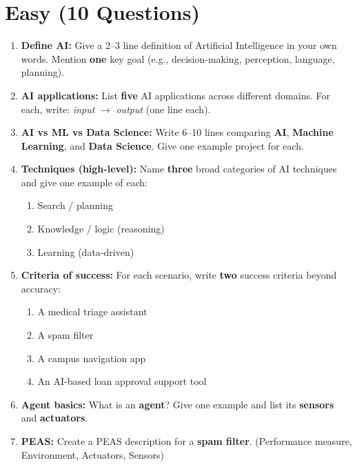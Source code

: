 \documentclass[11pt,a4paper]{article}
\begin{document}
\section*{Easy (10 Questions)}
\begin{enumerate}[label=E\arabic*., leftmargin=*]
  \item \textbf{Define AI:} Give a 2--3 line definition of Artificial Intelligence in your own words.
    Mention \textbf{one} key goal (e.g., decision-making, perception, language, planning).

  \item \textbf{AI applications:} List \textbf{five} AI applications across different domains.
    For each, write: \emph{input} $\rightarrow$ \emph{output} (one line each).

  \item \textbf{AI vs ML vs Data Science:} Write 6--10 lines comparing \textbf{AI}, \textbf{Machine Learning}, and \textbf{Data Science}.
    Give one example project for each.

  \item \textbf{Techniques (high-level):} Name \textbf{three} broad categories of AI techniques and give one example of each:
    \begin{enumerate}[label=(\alph*), leftmargin=*]
      \item Search / planning
      \item Knowledge / logic (reasoning)
      \item Learning (data-driven)
    \end{enumerate}

  \item \textbf{Criteria of success:} For each scenario, write \textbf{two} success criteria beyond accuracy:
    \begin{enumerate}[label=(\alph*), leftmargin=*]
      \item A medical triage assistant
      \item A spam filter
      \item A campus navigation app
      \item An AI-based loan approval support tool
    \end{enumerate}

  \item \textbf{Agent basics:} What is an \textbf{agent}? Give one example and list its \textbf{sensors} and \textbf{actuators}.

  \item \textbf{PEAS:} Create a PEAS description for a \textbf{spam filter}.
    (Performance measure, Environment, Actuators, Sensors)


\end{enumerate}
\end{document}
